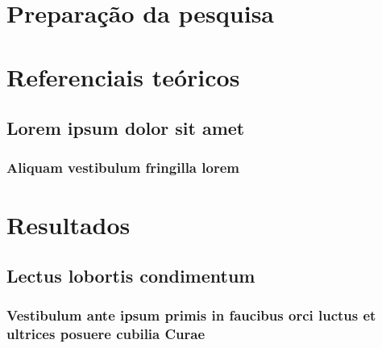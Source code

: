 \documentclass[
12pt,				%
openright,			%
twoside,			%
a4paper,			%
english,			%
french,				%
spanish,			%
brazil				%
]{abntex2}
\begin{document}
        \part{Preparação da pesquisa}
        
        
        
        \part{Referenciais teóricos}
        
        \chapter{Lorem ipsum dolor sit amet}
        
        \section{Aliquam vestibulum fringilla lorem}
        
        \lipsum[1]
        
        \lipsum[2-3]
        
        \part{Resultados}
        
        \chapter{Lectus lobortis condimentum}
        
        \section{Vestibulum ante ipsum primis in faucibus orci luctus et ultrices
            posuere cubilia Curae}
        
\end{document}
